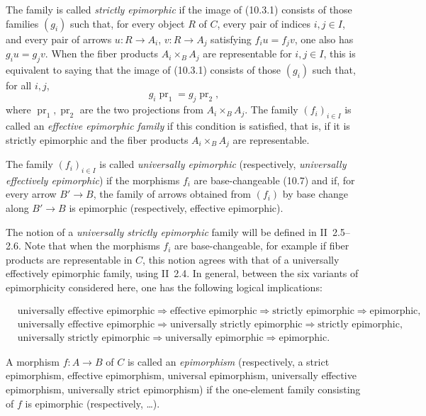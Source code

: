 \documentclass[11pt]{article}
\newcommand{\pr}{\operatorname{pr}}
\begin{document}
The family is called \emph{strictly epimorphic} if the image of (10.3.1) consists of those families \((g_i)\) such that, for every object \(R\) of \(C\), every pair of indices \(i,j\in I\), and every pair of arrows \(u:R\to A_i\), \(v:R\to A_j\) satisfying \(f_i u=f_jv\), one also has \(g_i u=g_jv\). When the fiber products \(A_i\times_B A_j\) are representable for \(i,j\in I\), this is equivalent to saying that the image of (10.3.1) consists of those \((g_i)\) such that, for all \(i,j\),
\[
 g_i\pr_1=g_j\pr_2,
\]
where \(\pr_1,\pr_2\) are the two projections from \(A_i\times_B A_j\). The family \((f_i)_{i\in I}\) is called an \emph{effective epimorphic family} if this condition is satisfied, that is, if it is strictly epimorphic and the fiber products \(A_i\times_B A_j\) are representable.

The family \((f_i)_{i\in I}\) is called \emph{universally epimorphic} (respectively, \emph{universally effectively epimorphic}) if the morphisms \(f_i\) are base-changeable (10.7) and if, for every arrow \(B'\to B\), the family of arrows obtained from \((f_i)\) by base change along \(B'\to B\) is epimorphic (respectively, effective epimorphic).

The notion of a \emph{universally strictly epimorphic} family will be defined in II~2.5--2.6. Note that when the morphisms \(f_i\) are base-changeable, for example if fiber products are representable in \(C\), this notion agrees with that of a universally effectively epimorphic family, using II~2.4. In general, between the six variants of epimorphicity considered here, one has the following logical implications:


\[
\begin{aligned}
&\text{universally effective epimorphic}\Rightarrow\text{effective epimorphic}\Rightarrow\text{strictly epimorphic}\Rightarrow\text{epimorphic},\\
&\text{universally effective epimorphic}\Rightarrow\text{universally strictly epimorphic}\Rightarrow\text{strictly epimorphic},\\
&\text{universally strictly epimorphic}\Rightarrow\text{universally epimorphic}\Rightarrow\text{epimorphic}.
\end{aligned}
\]


A morphism \(f:A\to B\) of \(C\) is called an \emph{epimorphism} (respectively, a strict epimorphism, effective epimorphism, universal epimorphism, universally effective epimorphism, universally strict epimorphism) if the one-element family consisting of \(f\) is epimorphic (respectively, \ldots).
\end{document}
